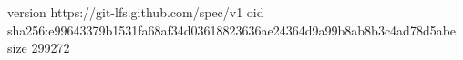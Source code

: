 version https://git-lfs.github.com/spec/v1
oid sha256:e99643379b1531fa68af34d03618823636ae24364d9a99b8ab8b3c4ad78d5abe
size 299272
